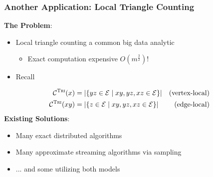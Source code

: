 \documentclass{beamer}
\newcommand{\algoname}[1]{\textnormal{\textsc{#1}}}
\begin{document}
\begin{frame}
\frametitle{Another Application: Local Triangle Counting}

\textbf{The Problem}:
\begin{itemize}
	\item Local triangle counting a common big data analytic
	\begin{itemize}
		\item Exact computation expensive $O \left ( m^{\frac{3}{2}} \right )$!
	\end{itemize}
	\item Recall
\end{itemize}
%
\vspace{-0.5em}
\begin{align*}
	\mathcal{C}^{\algoname{Tri}}(x) 
	&= |\{yz \in \mathcal{E} \mid xy, yz, xz \in \mathcal{E} \}| 
	& \textnormal{(vertex-local)} \\
	\mathcal{C}^{\algoname{Tri}}(xy) 
	&= |\{z \in \mathcal{E} \mid xy, yz, xz \in \mathcal{E} \}|
	& \textnormal{(edge-local)} 
\end{align*}
%
\textbf{Existing Solutions}:
\begin{itemize}
	\item Many exact distributed algorithms \cite{arifuzzaman2013patric, pearce2017triangle}
	\item Many approximate streaming algorithms via sampling \cite{lim2015mascot, stefani2017triest}
	\item ... and some utilizing both models \cite{shin2018tri, shin2018dislr}
\end{itemize}


\end{frame}


\end{document}
